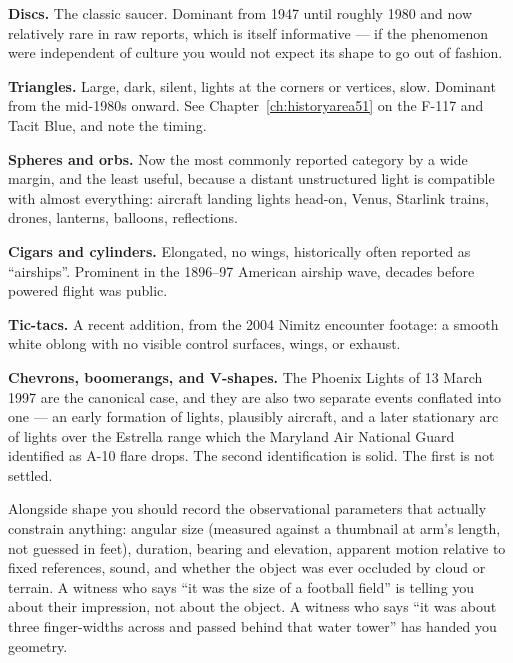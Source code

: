 \textbf{Discs.} The classic saucer. Dominant from 1947 until roughly 1980 and now
relatively rare in raw reports, which is itself informative --- if the phenomenon were
independent of culture you would not expect its shape to go out of fashion.

\textbf{Triangles.} Large, dark, silent, lights at the corners or vertices, slow. Dominant
from the mid-1980s onward. See Chapter~\ref{ch:historyarea51} on the F-117 and Tacit Blue, and note the timing.

\textbf{Spheres and orbs.} Now the most commonly reported category by a wide margin, and
the least useful, because a distant unstructured light is compatible with almost
everything: aircraft landing lights head-on, Venus, Starlink trains, drones, lanterns,
balloons, reflections.

\textbf{Cigars and cylinders.} Elongated, no wings, historically often reported as
``airships''. Prominent in the 1896--97 American airship wave, decades before powered
flight was public.

\textbf{Tic-tacs.} A recent addition, from the 2004 Nimitz encounter footage: a smooth
white oblong with no visible control surfaces, wings, or exhaust.

\textbf{Chevrons, boomerangs, and V-shapes.} The Phoenix Lights of 13 March 1997 are the
canonical case, and they are also two separate events conflated into one --- an early
formation of lights, plausibly aircraft, and a later stationary arc of lights over the
Estrella range which the Maryland Air National Guard identified as A-10 flare drops. The
second identification is solid. The first is not settled.

Alongside shape you should record the observational parameters that actually constrain
anything: angular size (measured against a thumbnail at arm's length, not guessed in
feet), duration, bearing and elevation, apparent motion relative to fixed references,
sound, and whether the object was ever occluded by cloud or terrain.  A witness who says ``it was the size of a
football field'' is telling you about their impression, not about the object. A witness who
says ``it was about three finger-widths across and passed behind that water tower'' has
handed you geometry.

